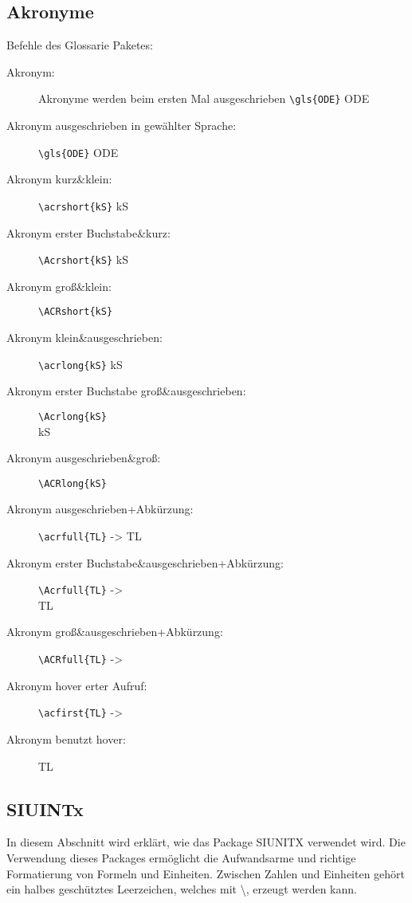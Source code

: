 \subsection{Akronyme}
\label{subsec:akronyme}
Befehle des Glossarie Paketes:
\begin{description}
	\item[Akronym:]	 Akronyme werden beim ersten Mal ausgeschrieben \verb=\gls{ODE}= \gls{ODE}
	\item[Akronym ausgeschrieben in gewählter Sprache:] \verb=\gls{ODE}= \gls{ODE}
	\item[Akronym kurz\&klein:] \verb=\acrshort{kS}= \acrshort{kS} 
	\item[Akronym erster Buchstabe\&kurz:] \verb=\Acrshort{kS}= \Acrshort{kS} 
	\item[Akronym groß\&klein:] \verb== \ACRshort{kS} 
	\item[Akronym klein\&ausgeschrieben:] \verb=\acrlong{kS}= \acrlong{kS} 
	\item[Akronym erster Buchstabe groß\&ausgeschrieben:] \verb=\Acrlong{kS}= \\ \Acrlong{kS} 
	\item[Akronym ausgeschrieben\&groß:] \verb== \ACRlong{kS} 
	\item[Akronym ausgeschrieben+Abkürzung:] \verb=\acrfull{TL}= -> \acrfull{TL}
	\item[Akronym erster Buchstabe\&ausgeschrieben+Abkürzung:]\verb=\Acrfull{TL}= -> \\ \Acrfull{TL}
	\item[Akronym groß\&ausgeschrieben+Abkürzung:] \verb== -> \\ \ACRfull{TL}
	\item [Akronym hover erter Aufruf:] \verb== -> \acfirst{TL}
	\item [Akronym benutzt hover:] \ac{TL}
\end{description}	


\subsection{SIUINTx}
\label{subsec:siunitx}
In diesem Abschnitt wird erklärt, wie das Package SIUNITX verwendet wird. Die Verwendung dieses Packages ermöglicht die Aufwandsarme und richtige Formatierung von Formeln und Einheiten. Zwischen Zahlen und Einheiten gehört ein halbes geschütztes Leerzeichen, welches mit \textbackslash, erzeugt werden kann. 

